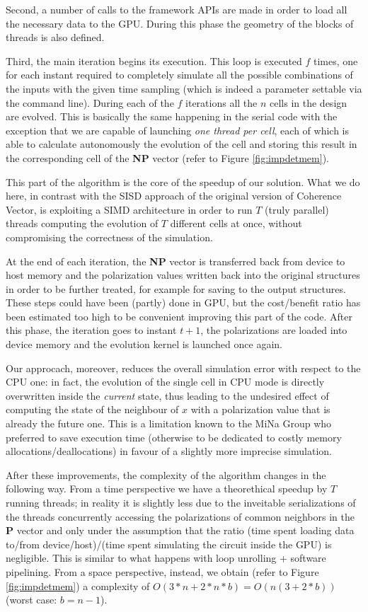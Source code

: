 Second, a number of calls to the framework APIs are made in order to load all the necessary data to the GPU. During this phase the geometry of the blocks of threads is also defined.

Third, the main iteration begins its execution. This loop is executed $f$ times, one for each instant required to completely simulate all the possible combinations of the inputs with the given time sampling (which is indeed a parameter settable via the command line). During each of the $f$ iterations all the $n$ cells in the design are evolved. This is basically the same happening in the serial code with the exception that we are capable of launching \textsl{one thread per cell}, each of which is able to calculate autonomously the evolution of the cell and storing this result in the corresponding cell of the \textbf{NP} vector (refer to Figure \ref{fig:impdetmem}). 

This part of the algorithm is the core of the speedup of our solution. What we do here, in contrast with the SISD approach of the original version of Coherence Vector, is exploiting a SIMD architecture in order to run $T$ (truly parallel) threads computing the evolution of $T$ different cells at once, without compromising the correctness of the simulation.

At the end of each iteration, the \textbf{NP} vector is transferred back from device to host memory and the polarization values written back into the original structures in order to be further treated, for example for saving to the output structures. These steps could have been (partly) done in GPU, but the cost\slash benefit ratio has been estimated too high to be convenient improving this part of the code. After this phase, the iteration goes to instant $t+1$, the polarizations are loaded into device memory and the evolution kernel is launched once again.

Our approcach, moreover, reduces the overall simulation error with respect to the CPU one: in fact, the evolution of the single cell in CPU mode is directly overwritten inside the \textsl{current} state, thus leading to the undesired effect of computing the state of the neighbour of $x$ with a polarization value that is already the future one. This is a limitation known to the MiNa Group who preferred to save execution time (otherwise to be dedicated to costly memory allocations/deallocations) in favour of a slightly more imprecise simulation.

After these improvements, the complexity of the algorithm changes in the following way. From a time perspective we have a theorethical speedup by $T$ running threads; in reality it is slightly less due to the inveitable serializations of the threads concurrently accessing the polarizations of common neighbors in the \textbf{P} vector and only under the assumption that the ratio (time spent loading data to/from device/host)/(time spent simulating the circuit inside the GPU) is negligible. This is similar to what happens with loop unrolling + software pipelining. From a space perspective, instead, we obtain (refer to Figure \ref{fig:impdetmem}) a complexity of $O(3*n+2*n*b)=O(n(3+2*b))$ (worst case: $b=n-1$).
